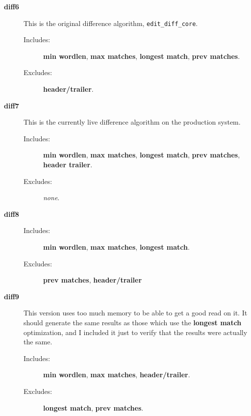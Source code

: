\begin{description}
\item[\textbf{diff6}] This is the original difference algorithm,
    \texttt{edit\_diff\_core}.
    \begin{description}
    \item[Includes:]
        \textbf{min wordlen}, \textbf{max matches}, \textbf{longest match},
        \textbf{prev matches}.
    \item[Excludes:]
        \textbf{header/trailer}.
    \end{description}

\item[\textbf{diff7}]
    This is the currently live difference algorithm on the production system.
    \begin{description}
    \item[Includes:]
        \textbf{min wordlen}, \textbf{max matches}, \textbf{longest match},
        \textbf{prev matches}, \textbf{header trailer}.
   \item[Excludes:] \textit{none}.
    \end{description}

\item[\textbf{diff8}]
    \begin{description}
    \item[Includes:]
        \textbf{min wordlen}, \textbf{max matches}, \textbf{longest match}.
    \item[Excludes:]
        \textbf{prev matches}, \textbf{header/trailer}
    \end{description}

\item[\textbf{diff9}]
    This version uses too much memory to be able to get a good read
    on it.  It should generate the same results as those which use
    the \textbf{longest match} optimization, and I included it just
    to verify that the results were actually the same.
    \begin{description}
    \item[Includes:]
        \textbf{min wordlen}, \textbf{max matches},
        \textbf{header/trailer}.
    \item[Excludes:]
        \textbf{longest match}, \textbf{prev matches}.
    \end{description}

\end{description}


